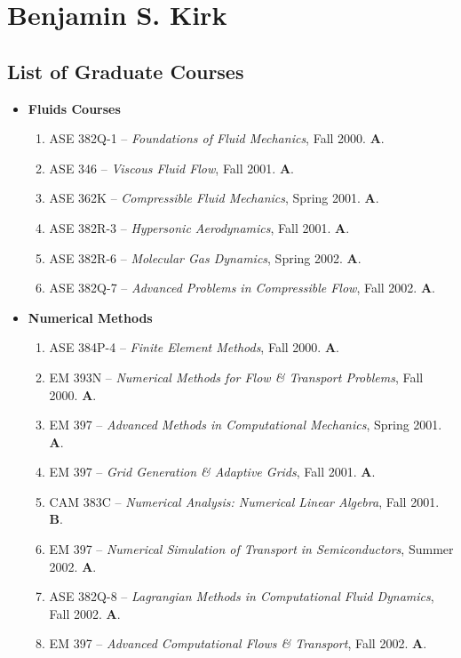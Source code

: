\documentclass[11pt]{article}
\begin{document}
\section*{Benjamin S. Kirk}
\subsection*{List of Graduate Courses}
\begin{itemize}
  \item \textbf{Fluids Courses}
    \begin{enumerate}
    \item ASE 382Q-1 -- \emph{Foundations of Fluid Mechanics}, Fall 2000. \textbf{A}. 
    \item ASE 346 -- \emph{Viscous Fluid Flow}, Fall 2001.  \textbf{A}.
    \item ASE 362K -- \emph{Compressible Fluid Mechanics}, Spring 2001. \textbf{A}.
    \item ASE 382R-3 -- \emph{Hypersonic Aerodynamics}, Fall 2001. \textbf{A}.
    \item ASE 382R-6 -- \emph{Molecular Gas Dynamics}, Spring 2002. \textbf{A}.
    \item ASE 382Q-7 -- \emph{Advanced Problems in Compressible Flow}, Fall 2002. \textbf{A}.
    \end{enumerate}
  \item \textbf{Numerical Methods}
    \begin{enumerate}
    \item ASE 384P-4 -- \emph{Finite Element Methods}, Fall 2000. \textbf{A}.
    \item EM 393N -- \emph{Numerical Methods for Flow \& Transport Problems}, Fall 2000. \textbf{A}.
    \item EM 397 -- \emph{Advanced Methods in Computational Mechanics}, Spring 2001. \textbf{A}.
    \item EM 397 -- \emph{Grid Generation \& Adaptive Grids}, Fall 2001. \textbf{A}.
    \item CAM 383C -- \emph{Numerical Analysis: Numerical Linear Algebra}, Fall 2001. \textbf{B}.
    \item EM 397 -- \emph{Numerical Simulation of Transport in Semiconductors}, Summer 2002. \textbf{A}.
    \item ASE 382Q-8 -- \emph{Lagrangian Methods in Computational Fluid Dynamics}, Fall 2002. \textbf{A}.
    \item EM 397 -- \emph{Advanced Computational Flows \& Transport}, Fall 2002. \textbf{A}.
    \end{enumerate}

\end{itemize}
\end{document}
